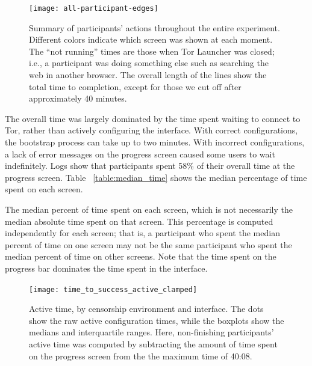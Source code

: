 \documentclass[USenglish,oneside,twocolumn]{article}
\begin{document}
{\begin{figure}
\centering
\texttt{[image: all-participant-edges]}
\caption{
Summary of participants' actions throughout the entire experiment.
Different colors indicate which screen was shown at each moment.
The ``not running'' times are those when Tor Launcher was closed;
i.e., a participant was doing something else
such as searching the web in another browser.
The overall length of the lines show the total time to completion,
except for those we cut off after approximately 40 minutes.
}
\label{fig:all-participant-edges}
\end{figure}

The overall time was largely dominated by the time spent waiting to connect to Tor, rather than actively configuring the interface. With correct configurations, the bootstrap process can take up to two minutes.  With incorrect configurations, a lack of error messages on the progress screen caused some users to wait indefinitely.  Logs show that participants spent 58\% of their overall time at the progress screen. Table ~\ref{table:median_time} shows the median percentage of time spent on each screen. 

\begin{table}[t]
\centering

\caption{The median percent of time spent on each screen, which is not
necessarily the median absolute time spent on that screen. 
This percentage is computed independently for each screen; that is, a participant who spent the median percent 
of time on one screen may not be the same participant who spent the median percent
of time on other screens. Note that the time spent on the progress bar dominates the 
time spent in the interface.} 
\label{table:median_time}
\end{table}

\begin{figure}[t]
\centering
\texttt{[image: time\_to\_success\_active\_clamped]}
\caption{
Active time, by censorship environment and interface.
The dots show the raw active configuration times,
while the boxplots show the medians and interquartile ranges.
Here, non-finishing participants' active time was computed by
subtracting the amount of time spent on the progress screen from the 
the maximum time of 40:08.
}
\label{fig:time_to_success_active_clamped}
\end{figure}

}
\end{document}
